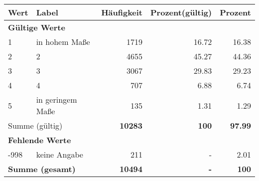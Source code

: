      \begin{longtable}{lXrrr}
     \toprule
     \textbf{Wert} & \textbf{Label} & \textbf{Häufigkeit} & \textbf{Prozent(gültig)} & \textbf{Prozent} \\
     \endhead
     \midrule
     \multicolumn{5}{l}{\textbf{Gültige Werte}}\\

     1 &
     \multicolumn{1}{X}{ in hohem Maße   } &


       \num{1719} &
       \num[round-mode=places,round-precision=2]{16,72} &
         \num[round-mode=places,round-precision=2]{16,38} \\

     2 &
     \multicolumn{1}{X}{ 2   } &


       \num{4655} &
       \num[round-mode=places,round-precision=2]{45,27} &
         \num[round-mode=places,round-precision=2]{44,36} \\

     3 &
     \multicolumn{1}{X}{ 3   } &


       \num{3067} &
       \num[round-mode=places,round-precision=2]{29,83} &
         \num[round-mode=places,round-precision=2]{29,23} \\

     4 &
     \multicolumn{1}{X}{ 4   } &


       \num{707} &
       \num[round-mode=places,round-precision=2]{6,88} &
         \num[round-mode=places,round-precision=2]{6,74} \\

     5 &
     \multicolumn{1}{X}{ in geringem Maße   } &


       \num{135} &
       \num[round-mode=places,round-precision=2]{1,31} &
         \num[round-mode=places,round-precision=2]{1,29} \\
     \midrule
     \multicolumn{2}{l}{Summe (gültig)} &
       \textbf{\num{10283}} &
     \textbf{100} &
       \textbf{\num[round-mode=places,round-precision=2]{97,99}} \\
     \multicolumn{5}{l}{\textbf{Fehlende Werte}}\\
       -998 &
       keine Angabe &
         \num{211} &
        - &
         \num[round-mode=places,round-precision=2]{2,01} \\
     \midrule
     \multicolumn{2}{l}{\textbf{Summe (gesamt)}} &
          \textbf{\num{10494}} &
        \textbf{-} &
        \textbf{100} \\
     \bottomrule
     \end{longtable}
     
